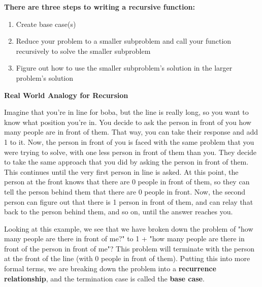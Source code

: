 \begin{blocksection}
\textbf{There are three steps to writing a recursive function:}
\begin{enumerate}
    \item Create base case(s)
    \item Reduce your problem to a smaller subproblem and call your function recursively to solve the smaller subproblem
    \item Figure out how to use the smaller subproblem's solution in the larger problem's solution
\end{enumerate}

\vspace{3mm}

\textbf{Real World Analogy for Recursion}


Imagine that you're in line for boba, but the line is really long, so you want to know what position you're in. You decide to ask the person in front of you how many people are in front of them. That way, you can take their response and add 1 to it. Now, the person in front of you is faced with the same problem that you were trying to solve, with one less person in front of them than you. They decide to take the same approach that you did by asking the person in front of them. This continues until the very first person in line is asked. At this point, the person at the front knows that there are 0 people in front of them, so they can tell the person behind them that there are 0 people in front. Now, the second person can figure out that there is 1 person in front of them, and can relay that back to the person behind them, and so on, until the answer reaches you.

Looking at this example, we see that we have broken down the problem of "how many people are there in front of me?" to 1 + "how many people are there in front of the person in front of me"? This problem will terminate with the person at the front of the line (with 0 people in front of them). Putting this into more formal terms, we are breaking down the problem into a \textbf{recurrence relationship}, and the termination case is called the \textbf{base case}.
\end{blocksection}

